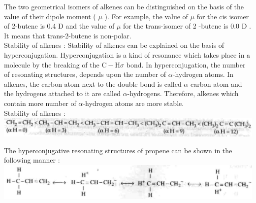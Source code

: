 \documentclass[10pt]{article}
\begin{document}
The two geometrical isomers of alkenes can be distinguished on the basis of the value of their dipole moment ( $\mu$ ). For example, the value of $\mu$ for the cis isomer of 2-butene is 0.4 D and the value of $\mu$ for the trans-isomer of 2 -butene is 0.0 D . It means that trans-2-butene is non-polar.\\
Stability of alkenes : Stability of alkenes can be explained on the basis of hyperconjugation. Hyperconjugation is a kind of resonance which takes place in a molecule by the breaking of the $\mathrm{C}-\mathrm{H} \sigma$ bond. In hyperconjugation, the number of resonating structures, depends upon the number of $\alpha$-hydrogen atoms. In alkenes, the carbon atom next to the double bond is called $\alpha$-carbon atom and the hydrogens attached to it are called $\alpha$-hydrogens. Therefore, alkenes which contain more number of $\alpha$-hydrogen atoms are more stable.\\
Stability of alkenes :\\
\includegraphics[max width=\textwidth, center]{2025_01_28_8470952b98110cec3aabg-176}

The hyperconjugative resonating structures of propene can be shown in the following manner :\\
\includegraphics[max width=\textwidth, center]{2025_01_28_8470952b98110cec3aabg-177(3)}
\end{document}
